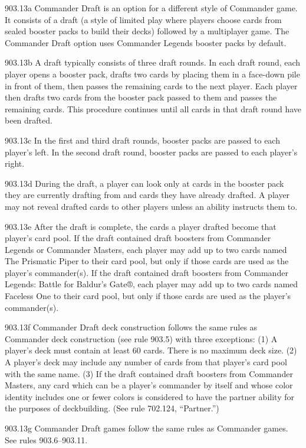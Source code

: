 903.13a Commander Draft is an option for a different style of Commander game. It consists of a draft (a style of limited play where players choose cards from sealed booster packs to build their decks) followed by a multiplayer game. The Commander Draft option uses Commander Legends booster packs by default.

903.13b A draft typically consists of three draft rounds. In each draft round, each player opens a booster pack, drafts two cards by placing them in a face-down pile in front of them, then passes the remaining cards to the next player. Each player then drafts two cards from the booster pack passed to them and passes the remaining cards. This procedure continues until all cards in that draft round have been drafted.

903.13c In the first and third draft rounds, booster packs are passed to each player’s left. In the second draft round, booster packs are passed to each player’s right.

903.13d During the draft, a player can look only at cards in the booster pack they are currently drafting from and cards they have already drafted. A player may not reveal drafted cards to other players unless an ability instructs them to.

903.13e After the draft is complete, the cards a player drafted become that player’s card pool. If the draft contained draft boosters from Commander Legends or Commander Masters, each player may add up to two cards named The Prismatic Piper to their card pool, but only if those cards are used as the player’s commander(s). If the draft contained draft boosters from Commander Legends: Battle for Baldur’s Gate®, each player may add up to two cards named Faceless One to their card pool, but only if those cards are used as the player’s commander(s).

903.13f Commander Draft deck construction follows the same rules as Commander deck construction (see rule 903.5) with three exceptions: (1) A player’s deck must contain at least 60 cards. There is no maximum deck size. (2) A player’s deck may include any number of cards from that player’s card pool with the same name. (3) If the draft contained draft boosters from Commander Masters, any card which can be a player’s commander by itself and whose color identity includes one or fewer colors is considered to have the partner ability for the purposes of deckbuilding. (See rule 702.124, “Partner.”)

903.13g Commander Draft games follow the same rules as Commander games. See rules 903.6–903.11.

